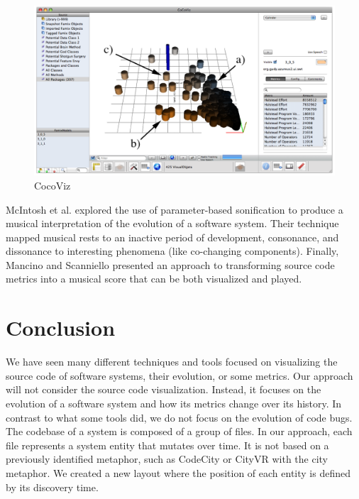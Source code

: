 \begin{figure}[ht]
\centering
  \includegraphics[width=0.9\linewidth]{CocoViz.png} 
  \caption{CocoViz}
  \label{fig:cocoviz}
\end{figure}


 
McIntosh et al. \cite{McIntosh2014} explored the use of parameter-based sonification to produce a musical interpretation of the evolution of a software system.
Their technique mapped musical rests to an inactive period of development, consonance, and dissonance to interesting phenomena (like co-changing components).
Finally, Mancino and Scanniello \cite{Mancino2017} presented an approach to transforming source code metrics into a musical score that can be both visualized and played. 


\section{Conclusion}

We have seen many different techniques and tools focused on visualizing the source code of software systems, their evolution, or some metrics.
Our approach will not consider the source code visualization. Instead, it focuses on the evolution of a software system and how its metrics change over its history. 
In contrast to what some tools did, we do not focus on the evolution of code bugs.\\

The codebase of a system is composed of a group of files. In our approach, each file represents a system entity that mutates over time.
It is not based on a previously identified metaphor, such as CodeCity or CityVR with the city metaphor.
We created a new layout where the position of each entity is defined by its discovery time. \\

